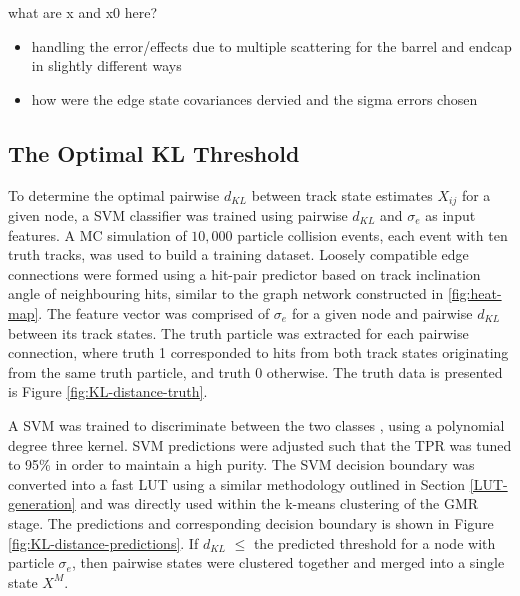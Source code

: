 what are x and x0 here? 


\begin{itemize}
\item handling the error/effects due to multiple scattering for the barrel and endcap in slightly different ways
\item how were the edge state covariances dervied and the sigma errors chosen
\end{itemize}





\subsection{The Optimal KL Threshold}
\label{chapter-6-kl-threshold}

To determine the optimal pairwise $d_{KL}$ between track state estimates $X_{ij}$ for a given node, a SVM classifier was trained using pairwise $d_{KL}$ and $\sigma_{e}$ as input features. A MC simulation of $10,000$ particle collision events, each event with ten truth tracks, was used to build a training dataset. Loosely compatible edge connections were formed using a hit-pair predictor based on track inclination angle of neighbouring hits, similar to the graph network constructed in \ref{fig:heat-map}. The feature vector was comprised of $\sigma_{e}$ for a given node and pairwise $d_{KL}$ between its track states. The truth particle was extracted for each pairwise connection, where truth 1 corresponded to hits from both track states originating from the same truth particle, and truth 0 otherwise. The truth data is presented is Figure \ref{fig:KL-distance-truth}.

A SVM was trained to discriminate between the two classes \cite{scikit-learn}, using a polynomial degree three kernel. SVM predictions were adjusted such that the TPR was tuned to 95\% in order to maintain a high purity. The SVM decision boundary was converted into a fast LUT using a similar methodology outlined in Section \ref{LUT-generation} and was directly used within the k-means clustering of the GMR stage. The predictions and corresponding decision boundary is shown in Figure \ref{fig:KL-distance-predictions}. If $d_{KL}$ $\leq$ the predicted threshold for a node with particle $\sigma_e$, then pairwise states were clustered together and merged into a single state $X^M$.

